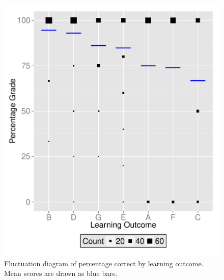 \documentclass[12pt,english,nohyper]{tufte-handout}\usepackage[]{graphicx}\usepackage[]{color}
\begin{document}
\vspace{5mm}

\begin{figure}[!ht]
\includegraphics[width=\linewidth]{Topic04_GH_LearningObj_boxplot.pdf}
\caption{Fluctuation diagram of percentage correct by learning outcome. Mean scores are drawn as blue bars.}
\label{fig:LearningObj_summary}
\end{figure}
\end{document}
